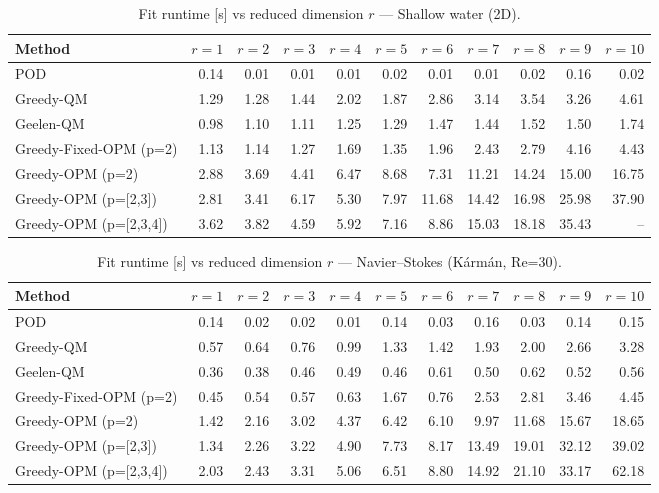 \begin{table}[t]
\centering
\caption{Fit runtime [s] vs reduced dimension $r$ --- Shallow water (2D).}
\label{tab:runtime-swe}
\small
\begin{tabular}{lrrrrrrrrrr}
\toprule
\textbf{Method} & $r=1$ & $r=2$ & $r=3$ & $r=4$ & $r=5$ & $r=6$ & $r=7$ & $r=8$ & $r=9$ & $r=10$ \\
\midrule
POD & 0.14 & 0.01 & 0.01 & 0.01 & 0.02 & 0.01 & 0.01 & 0.02 & 0.16 & 0.02 \\
Greedy-QM & 1.29 & 1.28 & 1.44 & 2.02 & 1.87 & 2.86 & 3.14 & 3.54 & 3.26 & 4.61 \\
Geelen-QM & 0.98 & 1.10 & 1.11 & 1.25 & 1.29 & 1.47 & 1.44 & 1.52 & 1.50 & 1.74 \\
Greedy-Fixed-OPM (p=2) & 1.13 & 1.14 & 1.27 & 1.69 & 1.35 & 1.96 & 2.43 & 2.79 & 4.16 & 4.43 \\
Greedy-OPM (p=2) & 2.88 & 3.69 & 4.41 & 6.47 & 8.68 & 7.31 & 11.21 & 14.24 & 15.00 & 16.75 \\
Greedy-OPM (p=[2,3]) & 2.81 & 3.41 & 6.17 & 5.30 & 7.97 & 11.68 & 14.42 & 16.98 & 25.98 & 37.90 \\
Greedy-OPM (p=[2,3,4]) & 3.62 & 3.82 & 4.59 & 5.92 & 7.16 & 8.86 & 15.03 & 18.18 & 35.43 & -- \\
\bottomrule
\end{tabular}
\end{table}

\begin{table}[t]
\centering
\caption{Fit runtime [s] vs reduced dimension $r$ --- Navier--Stokes (K\'arm\'an, Re=30).}
\label{tab:runtime-nse}
\small
\begin{tabular}{lrrrrrrrrrr}
\toprule
\textbf{Method} & $r=1$ & $r=2$ & $r=3$ & $r=4$ & $r=5$ & $r=6$ & $r=7$ & $r=8$ & $r=9$ & $r=10$ \\
\midrule
POD & 0.14 & 0.02 & 0.02 & 0.01 & 0.14 & 0.03 & 0.16 & 0.03 & 0.14 & 0.15 \\
Greedy-QM & 0.57 & 0.64 & 0.76 & 0.99 & 1.33 & 1.42 & 1.93 & 2.00 & 2.66 & 3.28 \\
Geelen-QM & 0.36 & 0.38 & 0.46 & 0.49 & 0.46 & 0.61 & 0.50 & 0.62 & 0.52 & 0.56 \\
Greedy-Fixed-OPM (p=2) & 0.45 & 0.54 & 0.57 & 0.63 & 1.67 & 0.76 & 2.53 & 2.81 & 3.46 & 4.45 \\
Greedy-OPM (p=2) & 1.42 & 2.16 & 3.02 & 4.37 & 6.42 & 6.10 & 9.97 & 11.68 & 15.67 & 18.65 \\
Greedy-OPM (p=[2,3]) & 1.34 & 2.26 & 3.22 & 4.90 & 7.73 & 8.17 & 13.49 & 19.01 & 32.12 & 39.02 \\
Greedy-OPM (p=[2,3,4]) & 2.03 & 2.43 & 3.31 & 5.06 & 6.51 & 8.80 & 14.92 & 21.10 & 33.17 & 62.18 \\
\bottomrule
\end{tabular}
\end{table}
